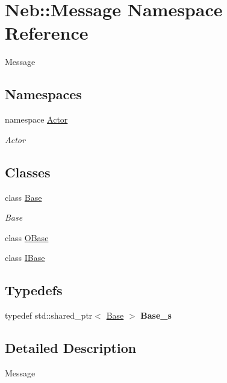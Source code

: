 \hypertarget{namespaceNeb_1_1Message}{\section{\-Neb\-:\-:\-Message \-Namespace \-Reference}
\label{namespaceNeb_1_1Message}
}


\-Message  


\subsection*{\-Namespaces}
\begin{DoxyCompactItemize}
\item 
namespace \hyperlink{namespaceNeb_1_1Message_1_1Actor}{\-Actor}
\begin{DoxyCompactList}\small\item\em \-Actor \end{DoxyCompactList}\end{DoxyCompactItemize}
\subsection*{\-Classes}
\begin{DoxyCompactItemize}
\item 
class \hyperlink{classNeb_1_1Message_1_1Base}{\-Base}
\begin{DoxyCompactList}\small\item\em \-Base \end{DoxyCompactList}\item 
class \hyperlink{classNeb_1_1Message_1_1OBase}{\-O\-Base}
\item 
class \hyperlink{classNeb_1_1Message_1_1IBase}{\-I\-Base}
\end{DoxyCompactItemize}
\subsection*{\-Typedefs}
\begin{DoxyCompactItemize}
\item 
\hypertarget{namespaceNeb_1_1Message_a790a36ad380408033e76d4f70ee4a229}{typedef std\-::shared\-\_\-ptr$<$ \hyperlink{classNeb_1_1Message_1_1Base}{\-Base} $>$ {\bfseries \-Base\-\_\-s}}\label{namespaceNeb_1_1Message_a790a36ad380408033e76d4f70ee4a229}

\end{DoxyCompactItemize}


\subsection{\-Detailed \-Description}
\-Message 